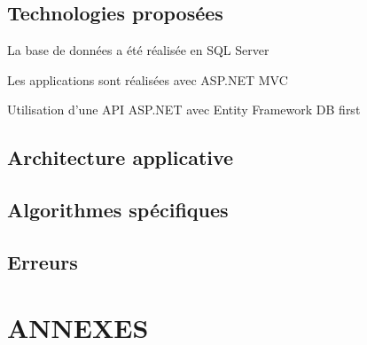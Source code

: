 \documentclass[a4paper,11pt]{article}
\begin{document}
	\subsection{Technologies proposées}
	
	La base de données a été réalisée en SQL Server
	
	Les applications sont réalisées avec ASP.NET MVC
	
	Utilisation d'une API ASP.NET avec Entity Framework DB first

	\subsection{Architecture applicative}

	\subsection{Algorithmes spécifiques}

	\subsection{Erreurs}

	\newpage
	
	\section{ANNEXES}
	
\end{document}
